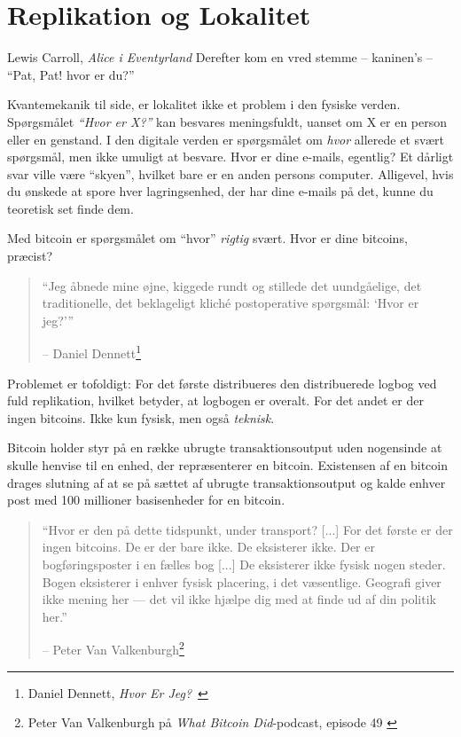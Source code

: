\chapter{Replikation og Lokalitet}
\label{les:3}

\begin{chapquote}{Lewis Carroll, \textit{Alice i Eventyrland}}
Derefter kom en vred stemme -- kaninen's -- \enquote{Pat, Pat! hvor er du?}
\end{chapquote}

Kvantemekanik til side, er lokalitet ikke et problem i den fysiske verden. 
Spørgsmålet \textit{\enquote{Hvor er X?}} kan besvares meningsfuldt, uanset om 
X er en person eller en genstand. I den digitale verden er spørgsmålet om 
\textit{hvor} allerede et svært spørgsmål, men ikke umuligt at besvare. Hvor er 
dine e-mails, egentlig? Et dårligt svar ville være \enquote{skyen}, hvilket 
bare er en anden persons computer. Alligevel, hvis du ønskede at spore hver 
lagringsenhed, der har dine e-mails på det, kunne du teoretisk set finde dem.

Med bitcoin er spørgsmålet om \enquote{hvor} \textit{rigtig} svært. Hvor er 
dine bitcoins, præcist?

\begin{quotation}\begin{samepage}
\enquote{Jeg åbnede mine øjne, kiggede rundt og stillede det uundgåelige, det 
traditionelle, det beklageligt kliché postoperative spørgsmål: `Hvor er jeg?'}
\begin{flushright} -- Daniel Dennett\footnote{Daniel Dennett, 
    \textit{Hvor Er Jeg?}~\cite{where-am-i}}
\end{flushright}\end{samepage}\end{quotation}

Problemet er tofoldigt: For det første distribueres den distribuerede logbog 
ved fuld replikation, hvilket betyder, at logbogen er overalt. For det andet 
er der ingen bitcoins. Ikke kun fysisk, men også \textit{teknisk}.

Bitcoin holder styr på en række ubrugte transaktionsoutput uden nogensinde at 
skulle henvise til en enhed, der repræsenterer en bitcoin. Existensen af en 
bitcoin drages slutning af at se på sættet af ubrugte transaktionsoutput og 
kalde enhver post med 100 millioner basisenheder for en bitcoin.

\begin{quotation}\begin{samepage}
\enquote{Hvor er den på dette tidspunkt, under transport? [...] For det første 
er der ingen bitcoins. De er der bare ikke. De eksisterer ikke. Der er 
bogføringsposter i en fælles bog [...] De eksisterer ikke fysisk nogen steder. 
Bogen eksisterer i enhver fysisk placering, i det væsentlige. Geografi giver 
ikke mening her --- det vil ikke hjælpe dig med at finde ud af din politik her.}
\begin{flushright} -- Peter Van Valkenburgh\footnote{Peter Van Valkenburgh på 
    \textit{What Bitcoin Did}-podcast, episode 49 \cite{wbd049}}
\end{flushright}\end{samepage}\end{quotation}


